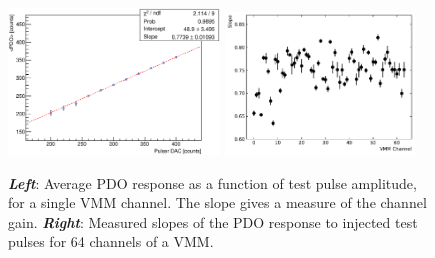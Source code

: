 \begin{figure}[!htb]
    \begin{center}
        \includegraphics[width=0.5\textwidth]{figures/nsw/calibration/calib_gain_curve}
        \includegraphics[width=0.45\textwidth]{figures/nsw/calibration/gain_curve_slope}
        \caption{
            \textbf{\textit{Left}}: Average PDO response as a function of test pulse amplitude,
                for a single VMM channel.
                The slope gives a measure of the channel gain.
            \textbf{\textit{Right}}: Measured slopes of the PDO response to injected test pulses
                for 64 channels of a VMM.
        }
        \label{fig:gain_curves}
    \end{center}
\end{figure}

